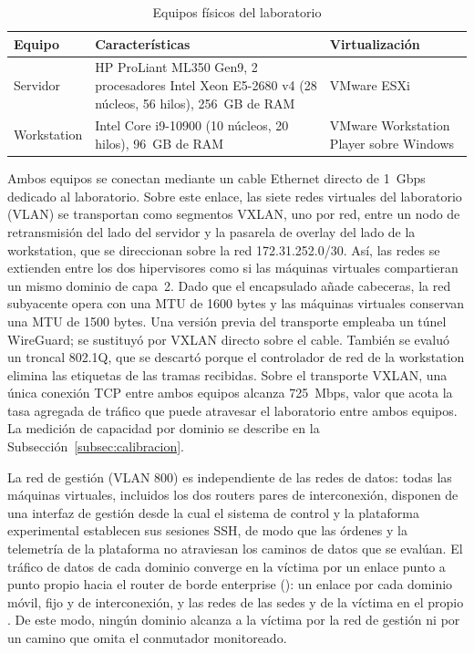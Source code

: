 \begin{table}[H]
    \begin{center}
        \renewcommand{\arraystretch}{1.5}
        \fontsize{10}{12}\selectfont
        \begin{tabular}{ >{\arraybackslash}m{3cm} >{\arraybackslash}m{5.5cm} >{\arraybackslash}m{5.5cm} }
        \hline
        \textbf{Equipo} & \textbf{Características} & \textbf{Virtualización} \\ \hline
        Servidor & HP ProLiant ML350 Gen9, 2 procesadores Intel Xeon E5-2680 v4 (28 núcleos, 56 hilos), 256~GB de RAM & VMware ESXi \\ \hline
        Workstation & Intel Core i9-10900 (10 núcleos, 20 hilos), 96~GB de RAM & VMware Workstation Player sobre Windows \\ \hline
        \end{tabular}
        \caption{Equipos físicos del laboratorio}
        \label{tab:equipos_lab}
    \end{center}
\end{table}

Ambos equipos se conectan mediante un cable Ethernet directo de 1~Gbps dedicado al laboratorio. Sobre este enlace, las siete redes virtuales del laboratorio (VLAN) se transportan como segmentos VXLAN, uno por red, entre un nodo de retransmisión del lado del servidor y la pasarela de overlay del lado de la workstation, que se direccionan sobre la red 172.31.252.0/30. Así, las redes se extienden entre los dos hipervisores como si las máquinas virtuales compartieran un mismo dominio de capa~2. Dado que el encapsulado añade cabeceras, la red subyacente opera con una MTU de 1600 bytes y las máquinas virtuales conservan una MTU de 1500 bytes. Una versión previa del transporte empleaba un túnel WireGuard; se sustituyó por VXLAN directo sobre el cable. También se evaluó un troncal 802.1Q, que se descartó porque el controlador de red de la workstation elimina las etiquetas de las tramas recibidas. Sobre el transporte VXLAN, una única conexión TCP entre ambos equipos alcanza 725~Mbps, valor que acota la tasa agregada de tráfico que puede atravesar el laboratorio entre ambos equipos. La medición de capacidad por dominio se describe en la Subsección~\ref{subsec:calibracion}.

La red de gestión (VLAN 800) es independiente de las redes de datos: todas las máquinas virtuales, incluidos los dos routers pares de interconexión, disponen de una interfaz de gestión desde la cual el sistema de control y la plataforma experimental establecen sus sesiones SSH, de modo que las órdenes y la telemetría de la plataforma no atraviesan los caminos de datos que se evalúan. El tráfico de datos de cada dominio converge en la víctima por un enlace punto a punto propio hacia el router de borde enterprise (): un enlace por cada dominio móvil, fijo y de interconexión, y las redes de las sedes y de la víctima en el propio . De este modo, ningún dominio alcanza a la víctima por la red de gestión ni por un camino que omita el conmutador monitoreado.

